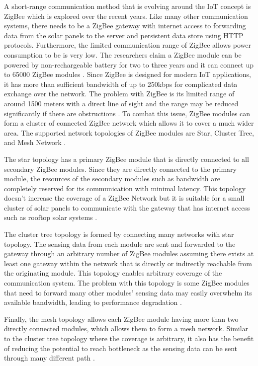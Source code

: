 \documentclass[../thesis.tex]{subfiles}
\begin{document}
A short-range communication method that is evolving around the IoT concept is ZigBee which is explored over the recent years. Like many other communication systems, there needs to be a ZigBee gateway with internet access to forwarding data from the solar panels to the server and persistent data store using HTTP protocols. Furthermore, the limited communication range of ZigBee allows power consumption to be is very low. The researchers claim a ZigBee module can be powered by non-rechargeable battery for two to three years and it can connect up to 65000 ZigBee modules \cite{SHARIFF20151730}. Since ZigBee is designed for modern IoT applications, it has more than sufficient bandwidth of up to 250kbps for complicated data exchange over the network. The problem with ZigBee is its limited range of around 1500 meters with a direct line of sight and the range may be reduced significantly if there are obstructions \cite{SHARIFF20151730}. To combat this issue, ZigBee modules can form a cluster of connected ZigBee network which allows it to cover a much wider area. The supported network topologies of ZigBee modules are Star, Cluster Tree, and Mesh Network \cite{SHARIFF20151730}.

The star topology has a primary ZigBee module that is directly connected to all secondary ZigBee modules. Since they are directly connected to the primary module, the resources of the secondary modules such as bandwidth are completely reserved for its communication with minimal latency. This topology doesn't increase the coverage of a ZigBee Network but it is suitable for a small cluster of solar panels to communicate with the gateway that has internet access such as rooftop solar systems \cite{SHARIFF20151730}.

The cluster tree topology is formed by connecting many networks with star topology. The sensing data from each module are sent and forwarded to the gateway through an arbitrary number of ZigBee modules assuming there exists at least one gateway within the network that is directly or indirectly reachable from the originating module. This topology enables arbitrary coverage of the communication system. The problem with this topology is some ZigBee modules that need to forward many other modules' sensing data may easily overwhelm its available bandwidth, leading to performance degradation \cite{SHARIFF20151730}.

Finally, the mesh topology allows each ZigBee module having more than two directly connected modules, which allows them to form a mesh network. Similar to the cluster tree topology where the coverage is arbitrary, it also has the benefit of reducing the potential to reach bottleneck as the sensing data can be sent through many different path \cite{SHARIFF20151730}.
\end{document}
